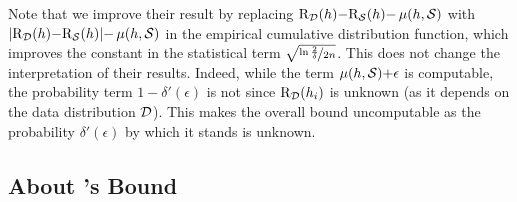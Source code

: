 \documentclass[twoside]{article}
\theoremstyle{plain}
\begin{document}
Note that we improve their result by replacing  $\text{R}_{\mathcal{D}}(h){-}\text{R}_{\mathcal{S}}(h){-}\operatorname{\mu}(h, \mathcal{S})$ with $|\text{R}_{\mathcal{D}}(h){-}\text{R}_{\mathcal{S}}(h)|{-}\operatorname{\mu}(h, \mathcal{S})$ in the empirical cumulative distribution function, which improves the constant in the statistical term $\sqrt{\nicefrac{\ln\frac{2}{\delta}}{2n}}$.
This does not change the interpretation of their results. 
Indeed, while the term $\operatorname{\mu}(h, \mathcal{S}) {+} \epsilon$ is computable, the probability term $1{-}\delta'(\epsilon)$ is not since $\text{R}_{\mathcal{D}}(h_i)$ is unknown (as it depends on the data distribution $\mathcal{D}$).
This makes the overall bound uncomputable as the probability $\delta'(\epsilon)$ by which it stands is unknown.

\subsection[About Catoni {[2007]}'s Bound]{About \citet{catoni2007pac}'s Bound}
\label{sec:comparison-catoni}
\end{document}
